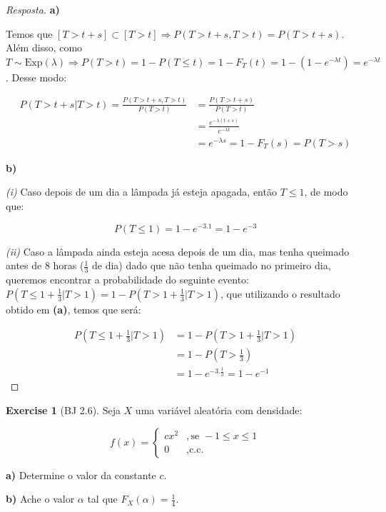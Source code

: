 \documentclass[
]{article}
\theoremstyle{definition}
\theoremstyle{definition}
\theoremstyle{definition}
\newtheorem{exercise}{Exercise}[section]
\theoremstyle{definition}
\theoremstyle{remark}
\begin{document}
\begin{proof}[Resposta]
\textbf{a)}

Temos que \([T > t+s] \subset [T > t] \Rightarrow P(T > t+s, T > t) = P(T > t+s)\). Além disso, como \(T \sim \mathrm{Exp}(\lambda) \Rightarrow P(T > t) = 1 - P(T \le t) = 1 - F_{T}(t) = 1 - (1 - e^{-\lambda t}) = e^{-\lambda t}\). Desse modo:

\begin{align*}
P(T > t+s | T > t) = \frac{P(T > t+s,T > t)}{P(T > t)} &= \frac{P(T > t+s)}{P(T > t)} \\
&= \frac{e^{-\lambda(t+s)}}{e^{-\lambda t}} \\
&= e^{-\lambda s} = 1 - F_{T}(s) = P(T > s)
\end{align*}

\textbf{b)}

\emph{(i)} Caso depois de um dia a lâmpada já esteja apagada, então \(T \le 1\), de modo que:

\begin{equation*}
P(T \le 1) = 1 - e^{-3.1} = 1 - e^{-3}
\end{equation*}

\emph{(ii)} Caso a lâmpada ainda esteja acesa depois de um dia, mas tenha queimado antes de 8 horas (\(\frac{1}{3}\) de dia) dado que não tenha queimado no primeiro dia, queremos encontrar a probabilidade do seguinte evento: \(P\left(T \le 1 + \frac{1}{3}|T > 1\right) = 1 - P\left(T > 1 + \frac{1}{3}|T > 1\right)\), que utilizando o resultado obtido em \textbf{(a)}, temos que será:

\begin{align*}
P\left(T \le 1 + \frac{1}{3}|T > 1\right) &= 1 - P\left(T > 1 + \frac{1}{3}|T > 1\right) \\
&= 1 - P\left(T > \frac{1}{3}\right) \\
&= 1 - e^{-3.\frac{1}{3}} = 1 - e^{-1}
\end{align*}
\end{proof}

\begin{exercise}[BJ 2.6]
Seja \(X\) uma variável aleatória com densidade:

\begin{equation*}
f(x) = \begin{cases}
cx^{2} & ,\text{se } -1 \le x \le 1 \\
0 & ,\text{c.c.}
\end{cases}
\end{equation*}

\textbf{a)} Determine o valor da constante \(c\).

\textbf{b)} Ache o valor \(\alpha\) tal que \(F_{X}(\alpha) = \frac{1}{4}\).
\end{exercise}
\end{document}
